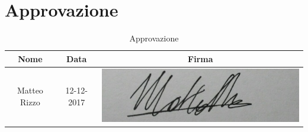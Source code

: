 \documentclass[./PianodiProgetto.tex]{subfiles}
\begin{document}
\section{Approvazione}
\begin{table}[H]
	\centering
	\begin{tabular}{|c|c|c|}
		\hline
		Nome&Data&Firma \\ \hline
		Matteo Rizzo& 12-12-2017 & \includegraphics[scale=0.5]{img/firme/RizzoMatteo} \\
		\hline
	\end{tabular}
	\caption{Approvazione}
\end{table}
\end{document}

